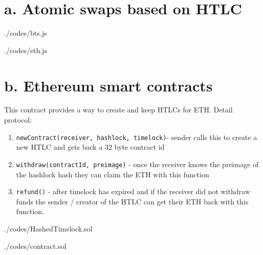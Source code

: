 




\section{a. Atomic swaps based on HTLC}

\begin{lstinputlisting}[language=JavaScript, captionpos=t, caption=Bitshares side, firstline = 10, lastline = 50]{./codes/bts.js}
\end{lstinputlisting}
\begin{lstinputlisting}[language=JavaScript, captionpos=t, caption=Ethereum Side, firstline = 14, lastline =50]{./codes/eth.js}


	
\end{lstinputlisting}

\section{b. Ethereum smart contracts}

\noindent This contract provides a way to create and keep
HTLCs for ETH. Detail protocol:

\begin{enumerate}
	\item \texttt{newContract(receiver, hashlock, timelock)}- sender calls this to create a new HTLC and gets back a 32 byte contract id
	\item \texttt{withdraw(contractId, preimage)} - once the receiver knows the preimage of the hashlock hash they can claim the ETH with this function
	\item \texttt{refund()} - after timelock has expired and if the receiver did not withdraw funds the sender / creator of the HTLC can get their ETH back with this function.
       

\end{enumerate}
  

\begin{lstinputlisting}[language=Solidity, firstline = 12, lastline =40, captionpos=t, caption = Hashed Timelock Contracts (HTLCs) on Ethereum]{./codes/HashedTimelock.sol}

\end{lstinputlisting}


\begin{lstinputlisting}[language=Solidity, firstline=20, lastline=50, captionpos =t, caption= Ethereum micro-payment channel -- Machinomy]{./codes/contract.sol}
	
\end{lstinputlisting}



